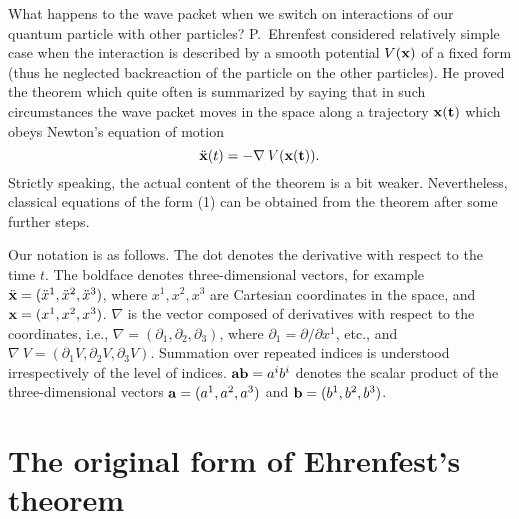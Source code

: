\documentclass[12pt]{article}
\begin{document}
What happens to the wave packet when we switch on interactions of our quantum particle with other particles? P.~Ehrenfest considered relatively simple case when the interaction is described by a smooth potential $V(\bf{x})$ of a fixed form (thus he neglected backreaction of the particle on the other particles). He proved the theorem which quite often is summarized by saying that in such circumstances the wave packet moves in the space along a trajectory $\bf{x}(t)$ which obeys Newton's equation of motion
\begin{equation} \ddot{\bf{x}}(t) = - \nabla \:V(\bf{x}(t)). \end{equation} 
Strictly speaking, the actual content of the theorem is a bit weaker. Nevertheless, classical equations of the form (1) can be obtained from the theorem after some further steps. 


Our notation is as follows. The dot denotes the derivative with respect to the time $t$. 
The boldface denotes three-dimensional vectors, for
example $\ddot{\bf{x}} = (\ddot{x}^1, \ddot{x}^2, \ddot{x}^3 )$, where $x^1, x^2, x^3 $ are Cartesian coordinates in the space, and ${\bf x} = (x^1, x^2, x^3)$. $\nabla$ is the vector composed of derivatives with respect to the coordinates, i.e., $\nabla = (\partial_1, \partial_2, \partial_3)$, where $\partial_1 = \partial/\partial x^1$, etc., and $\nabla \:V = (\partial_1 V, \partial_2 V, \partial_3 V).$ Summation over repeated indices is understood irrespectively of the level of indices. ${\bf a}{\bf b} = a^i b^i$ denotes the scalar product of the three-dimensional vectors ${\bf a}= (a^1, a^2, a^3)$ and $ {\bf b}= (b^1, b^2, b^3)$. 


\section{ The original form of Ehrenfest's theorem}
\end{document}

